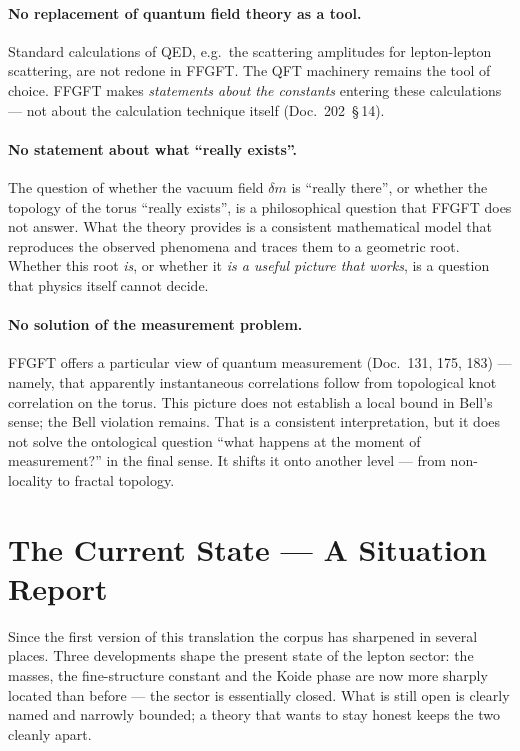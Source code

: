 \paragraph{No replacement of quantum field theory as a tool.}
Standard calculations of QED, e.g.\ the scattering amplitudes for
lepton-lepton scattering, are not redone in FFGFT. The QFT
machinery remains the tool of choice. FFGFT makes \emph{statements
about the constants} entering these calculations --- not about the
calculation technique itself (Doc.~202~\S\,14).

\paragraph{No statement about what \enquote{really exists}.}
The question of whether the vacuum field $\delta m$ is
\enquote{really there}, or whether the topology of the torus
\enquote{really exists}, is a philosophical question that FFGFT
does not answer. What the theory provides is a consistent
mathematical model that reproduces the observed phenomena and
traces them to a geometric root. Whether this root \emph{is}, or
whether it \emph{is a useful picture that works}, is a question
that physics itself cannot decide.

\paragraph{No solution of the measurement problem.}
FFGFT offers a particular view of quantum measurement
(Doc.~131, 175, 183) --- namely, that apparently instantaneous
correlations follow from topological knot correlation on the torus.
This picture does not establish a local bound in Bell's sense; the
Bell violation remains. That is a consistent interpretation, but it
does not solve the ontological question \enquote{what happens at
the moment of measurement?} in the final sense. It shifts it onto
another level --- from non-locality to fractal topology.

\section{The Current State --- A Situation Report}

Since the first version of this translation the corpus has sharpened in
several places. Three developments shape the present state of the lepton
sector: the masses, the fine-structure constant and the Koide phase are now
more sharply located than before --- the sector is essentially closed. What
is still open is clearly named and narrowly bounded; a theory that wants to
stay honest keeps the two cleanly apart.

